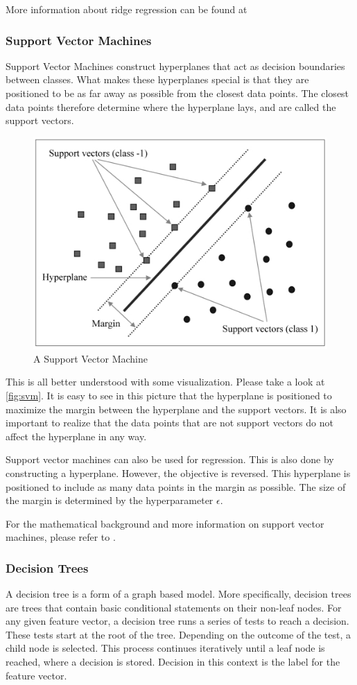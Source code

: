 More information about ridge regression can be found at \parencite{homl:4}

\subsubsection{Support Vector Machines}
Support Vector Machines construct hyperplanes that act as decision boundaries between classes.
What makes these hyperplanes special is that they are positioned to be as far away as possible from the closest data points.
The closest data points therefore determine where the hyperplane lays, and are called the support vectors. \parencite{homl:5}

\begin{figure}
	\centering
	\includegraphics[width=0.5\linewidth]{figures/svm}
	\caption{A Support Vector Machine \parencite{svm_pic}}
	\label{fig:svm}
\end{figure}

This is all better understood with some visualization. 
Please take a look at \autoref{fig:svm}.
It is easy to see in this picture that the hyperplane is positioned to maximize the margin between the hyperplane and the support vectors.
It is also important to realize that the data points that are not support vectors do not affect the hyperplane in any way. \parencite{homl:5}

Support vector machines can also be used for regression.
This is also done by constructing a hyperplane.
However, the objective is reversed.
This hyperplane is positioned to include as many data points in the margin as possible.
The size of the margin is determined by the hyperparameter $\epsilon$. \parencite{homl:5}

For the mathematical background and more information on support vector machines, please refer to \parencite{homl:5}.

\subsubsection{Decision Trees}
A decision tree is a form of a graph based model.\parencite{ml:prml}
More specifically, decision trees are trees that contain basic conditional statements on their non-leaf nodes.
For any given feature vector, a decision tree runs a series of tests to reach a decision.
These tests start at the root of the tree.
Depending on the outcome of the test, a child node is selected.
This process continues iteratively until a leaf node is reached, where a decision is stored.
Decision in this context is the label for the feature vector.\parencite{ai:ml}


